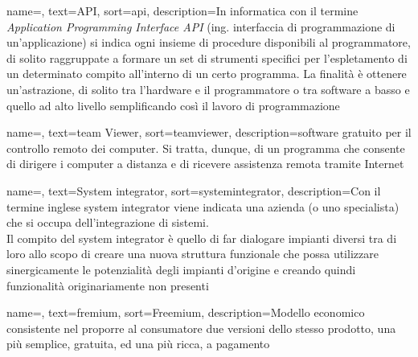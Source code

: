 
\renewcommand{\glossaryname}{Glossario}

{
    name=,
    text=API,
    sort=api,
    description={In informatica con il termine \emph{Application Programming Interface API} (ing. interfaccia di programmazione di un'applicazione) si indica ogni insieme di procedure disponibili al programmatore, di solito raggruppate a formare un set di strumenti specifici per l'espletamento di un determinato compito all'interno di un certo programma. La finalità è ottenere un'astrazione, di solito tra l'hardware e il programmatore o tra software a basso e quello ad alto livello semplificando così il lavoro di programmazione}
}


{
    name=,
    text=team Viewer,
    sort=teamviewer,
    description={software gratuito per il controllo remoto dei computer. Si tratta, dunque, di un programma che consente di dirigere i computer a distanza e di ricevere assistenza remota tramite Internet}
}

{
    name=,
    text=System integrator,
    sort=systemintegrator,
    description={Con il termine inglese system integrator viene indicata una azienda (o uno specialista) che si occupa dell'integrazione di sistemi.\\ Il compito del system integrator è quello di far dialogare impianti diversi tra di loro allo scopo di creare una nuova struttura funzionale che possa utilizzare sinergicamente le potenzialità degli impianti d'origine e creando quindi funzionalità originariamente non presenti}
}

{
    name=,
    text=fremium,
    sort=Freemium,
    description={Modello economico consistente nel proporre al consumatore due versioni dello stesso prodotto, una più semplice, gratuita, ed una più ricca, a pagamento}
}

